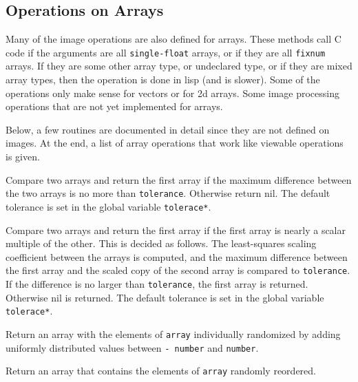 \subsection{Operations on Arrays}


Many of the image operations are also defined for arrays.  These
methods call C code if the arguments are all {\tt single-float}
arrays, or if they are all {\tt fixnum} arrays.  If they are some
other array type, or undeclared type, or if they are mixed array
types, then the operation is done in lisp (and is slower).  Some of
the operations only make sense for vectors or for 2d arrays. Some
image processing operations that are not yet implemented for
arrays.  

Below, a few routines are documented in detail since they are
not defined on images. At the end, a list of array operations 
that work like viewable operations is given.
\begin{description}
\item{}
Compare two arrays and return the first array if 
the maximum difference between the two arrays is 
no more than {\tt tolerance}. Otherwise return nil.
The default tolerance is set in the global variable {\tt *tolerace*}.

\item{}
Compare two arrays and return the first array if 
the first array is nearly a scalar multiple of the other.
This is decided as follows. The least-squares 
scaling coefficient between the arrays is computed, 
and the maximum difference between the first array
and the scaled copy of the second array is compared
to {\tt tolerance}. If the difference is no larger
than {\tt tolerance}, the first array is returned.
Otherwise nil is returned.
The default tolerance is set in the global variable {\tt *tolerace*}.

\item{}
Return an array with the elements of {\tt array}
individually randomized by adding uniformly distributed
values between {\tt - number} and {\tt number}.

\item{}
Return an array that contains the elements of {\tt array}
randomly reordered.
\end{description}


